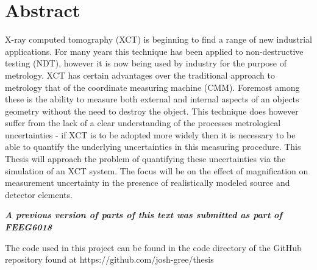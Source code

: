 \chapter*{Abstract}

X-ray computed tomography (XCT) is beginning to find a range of new industrial applications. For many years this technique has been applied to non-destructive testing (NDT), however it is now being used by industry for the purpose of metrology. XCT has certain advantages over the traditional approach to metrology that of the coordinate measuring machine (CMM). Foremost among these is the ability to measure both external and internal aspects of an objects geometry without the need to destroy the object. This technique does however suffer from the lack of a clear understanding of the processes metrological uncertainties - if XCT is to be adopted more widely then it is necessary to be able to quantify the underlying uncertainties in this measuring procedure. This Thesis will approach the problem of quantifying these uncertainties via the simulation of an XCT system. The focus will be on the effect of magnification on measurement uncertainty in the presence of realistically modeled source and detector elements.

\textbf{\textit{A previous version of parts of this text was submitted as part of FEEG6018}}

The code used in this project can be found in the code directory of the GitHub repository found at https://github.com/josh-gree/thesis
